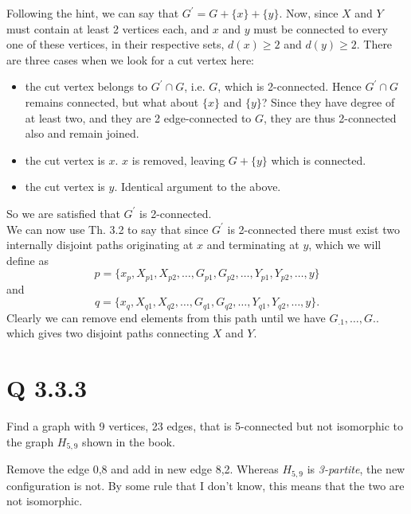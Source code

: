 Following the hint, we can say that $G^\prime = G + \{x\} + \{y\}$. Now, since $X$ and $Y$ must contain at least 2 vertices each, and $x$ and $y$ must be connected to every one of these vertices, in their respective sets, $d(x) \geq 2$ and $d(y) \geq 2$. There are three cases when we look for a cut vertex here:
\begin{itemize}
\item the cut vertex belongs to $G^\prime \cap G$, i.e. $G$, which is 2-connected. Hence $G^\prime \cap G$ remains connected, but what about $\{x\}$ and $\{y\}$? Since they have degree of at least two, and they are 2 edge-connected to $G$, they are thus 2-connected also and remain joined.
\item the cut vertex is $x$. $x$ is removed, leaving $G + \{y\}$ which is connected.
\item the cut vertex is $y$. Identical argument to the above.
\end{itemize}
So we are satisfied that $G^\prime$ is 2-connected.\\
We can now use Th. 3.2 to say that since $G^\prime$ is 2-connected there must exist two internally disjoint paths originating at $x$ and terminating at $y$, which we will define as 
\[
p = \{x_p, X_{p1}, X_{p2},\ldots,G_{p1},G_{p2},\ldots,Y_{p1},Y_{p2},\ldots, y\} 
\]
and 
\[
q = \{x_q, X_{q1}, X_{q2},\ldots,G_{q1},G_{q2},\ldots,Y_{q1},Y_{q2},\ldots, y\}. 
\]
Clearly we can remove end elements from this path until we have $G_{.1},\ldots,G{..}$ which gives two disjoint paths connecting $X$ and $Y$.

\section{Q 3.3.3}
Find a graph with 9 vertices, 23 edges, that is 5-connected but not isomorphic to the graph $H_{5,9}$ shown in the book.

Remove the edge 0,8 and add in new edge 8,2. Whereas $H_{5,9}$ is \emph{3-partite}, the new configuration is not. By some rule that I don't know, this means that the two are not isomorphic.

